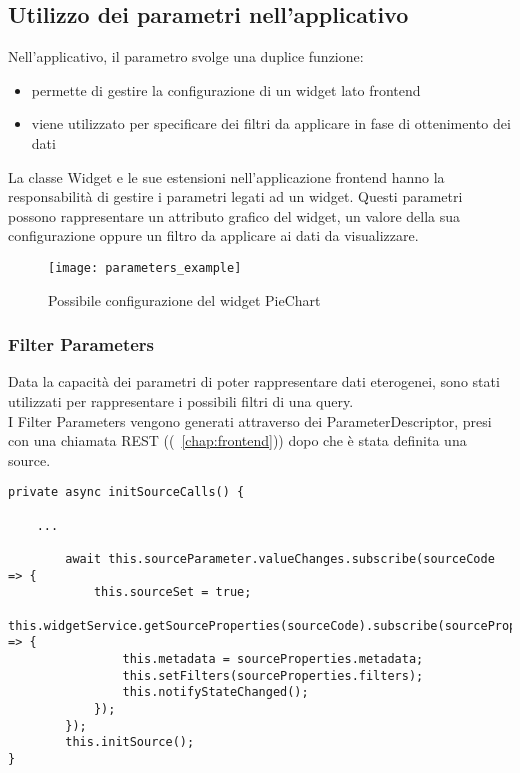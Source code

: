 \subsection{Utilizzo dei parametri nell'applicativo}
Nell'applicativo, il parametro svolge una duplice funzione:
\begin{itemize}
\item permette di gestire la configurazione di un widget lato frontend
\item viene utilizzato per specificare dei filtri da applicare in fase di ottenimento dei dati
\end{itemize}
La classe Widget e le sue estensioni nell'applicazione frontend hanno la responsabilità di gestire i parametri legati ad un widget. Questi parametri possono rappresentare un attributo grafico del widget, un valore della sua configurazione oppure un filtro da applicare ai dati da visualizzare.
\begin{figure}[h!]
\begin{center}
\texttt{[image: parameters\_example]}\\
\caption{Possibile configurazione del widget PieChart}
\end{center}
\end{figure}
\subsubsection{Filter Parameters}
Data la capacità dei parametri di poter rappresentare dati eterogenei, sono stati utilizzati per rappresentare i possibili filtri di una query.\\
I Filter Parameters vengono generati attraverso dei ParameterDescriptor, presi con una chiamata REST ((~\ref{chap:frontend})) dopo che è stata definita una source.
\begin{lstlisting}[caption={initSourceCalls, base-widget.ts},style=javascriptCode]
private async initSourceCalls() {

	...
	
        await this.sourceParameter.valueChanges.subscribe(sourceCode => {
            this.sourceSet = true;
            this.widgetService.getSourceProperties(sourceCode).subscribe(sourceProperties => {
                this.metadata = sourceProperties.metadata;
                this.setFilters(sourceProperties.filters);
                this.notifyStateChanged();
            });
        });
        this.initSource();
}
\end{lstlisting}